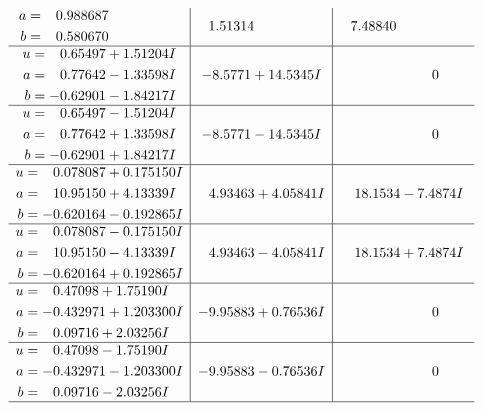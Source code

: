 \documentclass[1p]{elsarticle_modified}
\theoremstyle{definition}
\begin{document}
$$\begin{array}{c|c|c}
\begin{aligned}
a &= \phantom{-}0.988687\phantom{ +0.000000I} \\
b &= \phantom{-}0.580670\phantom{ +0.000000I}\end{aligned}
 & \phantom{-}1.51314\phantom{ +0.000000I} & \phantom{-}7.48840\phantom{ +0.000000I} \\ \hline\begin{aligned}
u &= \phantom{-}0.65497 + 1.51204 I \\
a &= \phantom{-}0.77642 - 1.33598 I \\
b &= -0.62901 - 1.84217 I\end{aligned}
 & -8.5771 + 14.5345 I & \phantom{-0.000000 } 0 \\ \hline\begin{aligned}
u &= \phantom{-}0.65497 - 1.51204 I \\
a &= \phantom{-}0.77642 + 1.33598 I \\
b &= -0.62901 + 1.84217 I\end{aligned}
 & -8.5771 - 14.5345 I & \phantom{-0.000000 } 0 \\ \hline\begin{aligned}
u &= \phantom{-}0.078087 + 0.175150 I \\
a &= \phantom{-}10.95150 + 4.13339 I \\
b &= -0.620164 - 0.192865 I\end{aligned}
 & \phantom{-}4.93463 + 4.05841 I & \phantom{-}18.1534 - 7.4874 I \\ \hline\begin{aligned}
u &= \phantom{-}0.078087 - 0.175150 I \\
a &= \phantom{-}10.95150 - 4.13339 I \\
b &= -0.620164 + 0.192865 I\end{aligned}
 & \phantom{-}4.93463 - 4.05841 I & \phantom{-}18.1534 + 7.4874 I \\ \hline\begin{aligned}
u &= \phantom{-}0.47098 + 1.75190 I \\
a &= -0.432971 + 1.203300 I \\
b &= \phantom{-}0.09716 + 2.03256 I\end{aligned}
 & -9.95883 + 0.76536 I & \phantom{-0.000000 } 0 \\ \hline\begin{aligned}
u &= \phantom{-}0.47098 - 1.75190 I \\
a &= -0.432971 - 1.203300 I \\
b &= \phantom{-}0.09716 - 2.03256 I\end{aligned}
 & -9.95883 - 0.76536 I & \phantom{-0.000000 } 0\\
 \hline 
 \end{array}$$\newpage\newpage\renewcommand{\arraystretch}{1}
\end{document}
